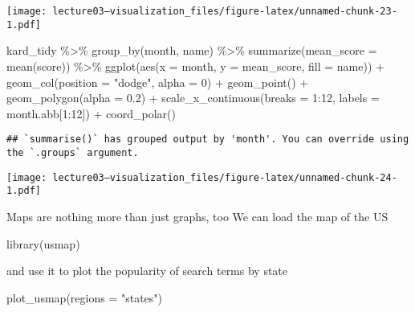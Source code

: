 \documentclass[
]{article}
\newenvironment{Shaded}{\begin{snugshade}}{\end{snugshade}}
\newcommand{\AttributeTok}[1]{\textcolor[rgb]{0.77,0.63,0.00}{#1}}
\newcommand{\DecValTok}[1]{\textcolor[rgb]{0.00,0.00,0.81}{#1}}
\newcommand{\FloatTok}[1]{\textcolor[rgb]{0.00,0.00,0.81}{#1}}
\newcommand{\FunctionTok}[1]{\textcolor[rgb]{0.00,0.00,0.00}{#1}}
\newcommand{\NormalTok}[1]{#1}
\newcommand{\SpecialCharTok}[1]{\textcolor[rgb]{0.00,0.00,0.00}{#1}}
\newcommand{\StringTok}[1]{\textcolor[rgb]{0.31,0.60,0.02}{#1}}
\begin{document}
\texttt{[image: lecture03---visualization\_files/figure-latex/unnamed-chunk-23-1.pdf]}

\begin{Shaded}
\begin{Highlighting}[]
\NormalTok{kard\_tidy }\SpecialCharTok{\%\textgreater{}\%} 
  \FunctionTok{group\_by}\NormalTok{(month, name) }\SpecialCharTok{\%\textgreater{}\%} 
  \FunctionTok{summarize}\NormalTok{(}\AttributeTok{mean\_score =} \FunctionTok{mean}\NormalTok{(score)) }\SpecialCharTok{\%\textgreater{}\%} 
  \FunctionTok{ggplot}\NormalTok{(}\FunctionTok{aes}\NormalTok{(}\AttributeTok{x =}\NormalTok{ month, }\AttributeTok{y =}\NormalTok{ mean\_score, }\AttributeTok{fill =}\NormalTok{ name)) }\SpecialCharTok{+}
  \FunctionTok{geom\_col}\NormalTok{(}\AttributeTok{position =} \StringTok{"dodge"}\NormalTok{, }\AttributeTok{alpha =} \DecValTok{0}\NormalTok{) }\SpecialCharTok{+}
  \FunctionTok{geom\_point}\NormalTok{() }\SpecialCharTok{+}
  \FunctionTok{geom\_polygon}\NormalTok{(}\AttributeTok{alpha =} \FloatTok{0.2}\NormalTok{) }\SpecialCharTok{+} 
  \FunctionTok{scale\_x\_continuous}\NormalTok{(}\AttributeTok{breaks =} \DecValTok{1}\SpecialCharTok{:}\DecValTok{12}\NormalTok{, }\AttributeTok{labels =}\NormalTok{  month.abb[}\DecValTok{1}\SpecialCharTok{:}\DecValTok{12}\NormalTok{]) }\SpecialCharTok{+} 
  \FunctionTok{coord\_polar}\NormalTok{()}
\end{Highlighting}
\end{Shaded}

\begin{verbatim}
## `summarise()` has grouped output by 'month'. You can override using the `.groups` argument.
\end{verbatim}

\texttt{[image: lecture03---visualization\_files/figure-latex/unnamed-chunk-24-1.pdf]}

Maps are nothing more than just graphs, too We can load the map of the
US

\begin{Shaded}
\begin{Highlighting}[]
\FunctionTok{library}\NormalTok{(usmap)}
\end{Highlighting}
\end{Shaded}

and use it to plot the popularity of search terms by state

\begin{Shaded}
\begin{Highlighting}[]
\FunctionTok{plot\_usmap}\NormalTok{(}\AttributeTok{regions =} \StringTok{"states"}\NormalTok{)}
\end{Highlighting}
\end{Shaded}
\end{document}
